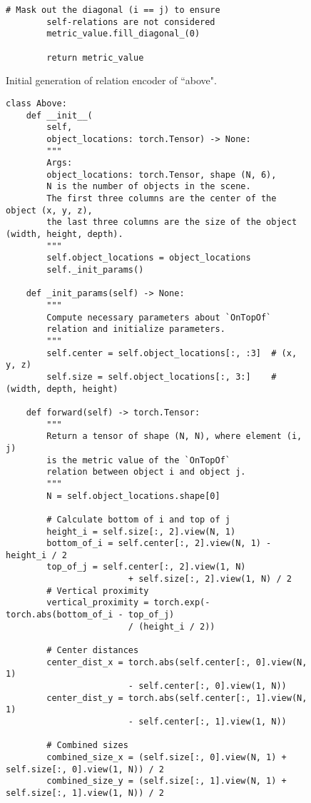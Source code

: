 \begin{figure*}[htbp]
\begin{subfigure}{0.45\textwidth}
\begin{lstlisting}[style=pythonstyle]
        # Mask out the diagonal (i == j) to ensure 
        self-relations are not considered
        metric_value.fill_diagonal_(0)

        return metric_value
        \end{lstlisting}
        \caption{Initial generation of relation encoder of ``above".}
        \label{fig:subfig-a}
    \end{subfigure}
    \hfill
    \begin{subfigure}{0.45\textwidth}
       \begin{lstlisting}[style=pythonstyle]
class Above:
    def __init__(
        self, 
        object_locations: torch.Tensor) -> None:
        """
        Args:
        object_locations: torch.Tensor, shape (N, 6), 
        N is the number of objects in the scene.
        The first three columns are the center of the object (x, y, z),
        the last three columns are the size of the object (width, height, depth).
        """
        self.object_locations = object_locations
        self._init_params()
    
    def _init_params(self) -> None:
        """
        Compute necessary parameters about `OnTopOf` 
        relation and initialize parameters.
        """
        self.center = self.object_locations[:, :3]  # (x, y, z)
        self.size = self.object_locations[:, 3:]    # (width, depth, height)
    
    def forward(self) -> torch.Tensor:
        """
        Return a tensor of shape (N, N), where element (i, j) 
        is the metric value of the `OnTopOf` 
        relation between object i and object j.
        """
        N = self.object_locations.shape[0]

        # Calculate bottom of i and top of j
        height_i = self.size[:, 2].view(N, 1)
        bottom_of_i = self.center[:, 2].view(N, 1) - height_i / 2
        top_of_j = self.center[:, 2].view(1, N) 
                        + self.size[:, 2].view(1, N) / 2
        # Vertical proximity
        vertical_proximity = torch.exp(-torch.abs(bottom_of_i - top_of_j) 
                        / (height_i / 2))

        # Center distances
        center_dist_x = torch.abs(self.center[:, 0].view(N, 1) 
                        - self.center[:, 0].view(1, N))
        center_dist_y = torch.abs(self.center[:, 1].view(N, 1) 
                        - self.center[:, 1].view(1, N))
    
        # Combined sizes
        combined_size_x = (self.size[:, 0].view(N, 1) + self.size[:, 0].view(1, N)) / 2
        combined_size_y = (self.size[:, 1].view(N, 1) + self.size[:, 1].view(1, N)) / 2


\end{lstlisting}
\end{subfigure}
\end{figure*}
